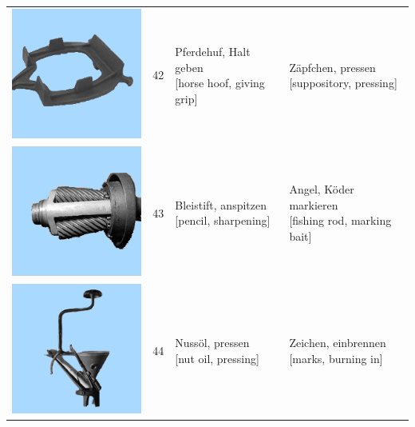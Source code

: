 \documentclass[
  english,
  man,floatsintext]{apa7}
\begin{document}
\begin{center}
\begin{ThreePartTable}
{\begin{longtable}{llll}
\includegraphics[valign=c, scale=0.23]{../materials/unfamiliar/42.png} & 42 & \makecell[l]{Pferdehuf, Halt geben\\{[horse hoof, giving grip]}} & \makecell[l]{Zäpfchen, pressen\\{[suppository, pressing]}}\\
\includegraphics[valign=c, scale=0.23]{../materials/unfamiliar/43.png} & 43 & \makecell[l]{Bleistift, anspitzen\\{[pencil, sharpening]}} & \makecell[l]{Angel, Köder markieren\\{[fishing rod, marking bait]}}\\
\includegraphics[valign=c, scale=0.23]{../materials/unfamiliar/44.png} & 44 & \makecell[l]{Nussöl, pressen\\{[nut oil, pressing]}} & \makecell[l]{Zeichen, einbrennen\\{[marks, burning in]}}\\

\end{longtable}}
\end{ThreePartTable}
\end{center}
\end{document}
